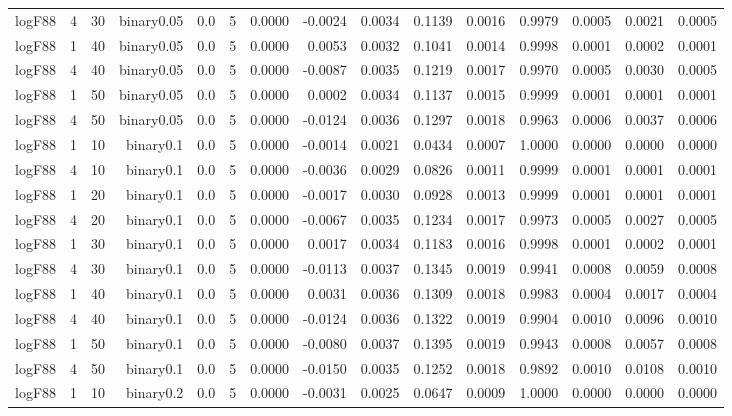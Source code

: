 \begin{longtable}{rrrrrrrrrrrrrrr}
  logF88 & 4 & 30 & binary0.05 & 0.0 & 5 & 0.0000 & -0.0024 & 0.0034 & 0.1139 & 0.0016 & 0.9979 & 0.0005 & 0.0021 & 0.0005 \\ 
  logF88 & 1 & 40 & binary0.05 & 0.0 & 5 & 0.0000 & 0.0053 & 0.0032 & 0.1041 & 0.0014 & 0.9998 & 0.0001 & 0.0002 & 0.0001 \\ 
  logF88 & 4 & 40 & binary0.05 & 0.0 & 5 & 0.0000 & -0.0087 & 0.0035 & 0.1219 & 0.0017 & 0.9970 & 0.0005 & 0.0030 & 0.0005 \\ 
  logF88 & 1 & 50 & binary0.05 & 0.0 & 5 & 0.0000 & 0.0002 & 0.0034 & 0.1137 & 0.0015 & 0.9999 & 0.0001 & 0.0001 & 0.0001 \\ 
  logF88 & 4 & 50 & binary0.05 & 0.0 & 5 & 0.0000 & -0.0124 & 0.0036 & 0.1297 & 0.0018 & 0.9963 & 0.0006 & 0.0037 & 0.0006 \\ 
  logF88 & 1 & 10 & binary0.1 & 0.0 & 5 & 0.0000 & -0.0014 & 0.0021 & 0.0434 & 0.0007 & 1.0000 & 0.0000 & 0.0000 & 0.0000 \\ 
  logF88 & 4 & 10 & binary0.1 & 0.0 & 5 & 0.0000 & -0.0036 & 0.0029 & 0.0826 & 0.0011 & 0.9999 & 0.0001 & 0.0001 & 0.0001 \\ 
  logF88 & 1 & 20 & binary0.1 & 0.0 & 5 & 0.0000 & -0.0017 & 0.0030 & 0.0928 & 0.0013 & 0.9999 & 0.0001 & 0.0001 & 0.0001 \\ 
  logF88 & 4 & 20 & binary0.1 & 0.0 & 5 & 0.0000 & -0.0067 & 0.0035 & 0.1234 & 0.0017 & 0.9973 & 0.0005 & 0.0027 & 0.0005 \\ 
  logF88 & 1 & 30 & binary0.1 & 0.0 & 5 & 0.0000 & 0.0017 & 0.0034 & 0.1183 & 0.0016 & 0.9998 & 0.0001 & 0.0002 & 0.0001 \\ 
  logF88 & 4 & 30 & binary0.1 & 0.0 & 5 & 0.0000 & -0.0113 & 0.0037 & 0.1345 & 0.0019 & 0.9941 & 0.0008 & 0.0059 & 0.0008 \\ 
  logF88 & 1 & 40 & binary0.1 & 0.0 & 5 & 0.0000 & 0.0031 & 0.0036 & 0.1309 & 0.0018 & 0.9983 & 0.0004 & 0.0017 & 0.0004 \\ 
  logF88 & 4 & 40 & binary0.1 & 0.0 & 5 & 0.0000 & -0.0124 & 0.0036 & 0.1322 & 0.0019 & 0.9904 & 0.0010 & 0.0096 & 0.0010 \\ 
  logF88 & 1 & 50 & binary0.1 & 0.0 & 5 & 0.0000 & -0.0080 & 0.0037 & 0.1395 & 0.0019 & 0.9943 & 0.0008 & 0.0057 & 0.0008 \\ 
  logF88 & 4 & 50 & binary0.1 & 0.0 & 5 & 0.0000 & -0.0150 & 0.0035 & 0.1252 & 0.0018 & 0.9892 & 0.0010 & 0.0108 & 0.0010 \\ 
  logF88 & 1 & 10 & binary0.2 & 0.0 & 5 & 0.0000 & -0.0031 & 0.0025 & 0.0647 & 0.0009 & 1.0000 & 0.0000 & 0.0000 & 0.0000 \\ 

\end{longtable}
